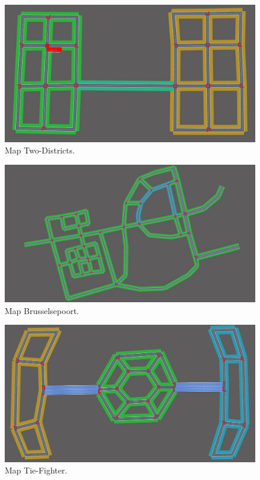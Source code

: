 \documentclass[11pt]{article}
\begin{document}
\begin{figure}[t]
	\includegraphics[width=\linewidth]{img/twodistr.jpeg}
	\caption{Map Two-Districts.}
\end{figure}

\begin{figure}[t]
	\includegraphics[width=\linewidth]{img/maas.jpeg}
	\caption{Map Brusselsepoort.}
\end{figure}

\begin{figure}[t]
	\includegraphics[width=\linewidth]{img/tie.jpeg}
	\caption{Map Tie-Fighter.}
\end{figure}
\end{document}
